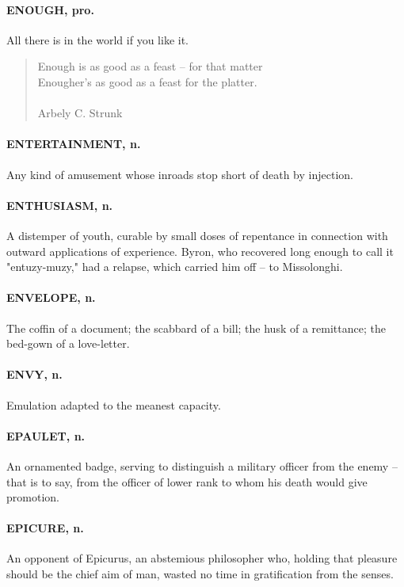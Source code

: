 \documentclass[11pt]{article}
\begin{document}
\paragraph{ENOUGH, pro.}  All there is in the world if you like it.

\begin{quote}   Enough is as good as a feast -- for that matter \\
  Enougher's as good as a feast for the platter. \\
 \\
Arbely C. Strunk \end{quote}


\paragraph{ENTERTAINMENT, n.}  Any kind of amusement whose inroads stop short of
death by injection.

\paragraph{ENTHUSIASM, n.}  A distemper of youth, curable by small doses of
repentance in connection with outward applications of experience.
Byron, who recovered long enough to call it "entuzy-muzy," had a
relapse, which carried him off -- to Missolonghi.

\paragraph{ENVELOPE, n.}  The coffin of a document; the scabbard of a bill; the
husk of a remittance; the bed-gown of a love-letter.

\paragraph{ENVY, n.}  Emulation adapted to the meanest capacity.

\paragraph{EPAULET, n.}  An ornamented badge, serving to distinguish a military
officer from the enemy -- that is to say, from the officer of lower
rank to whom his death would give promotion.

\paragraph{EPICURE, n.}  An opponent of Epicurus, an abstemious philosopher who,
holding that pleasure should be the chief aim of man, wasted no time
in gratification from the senses.
\end{document}
